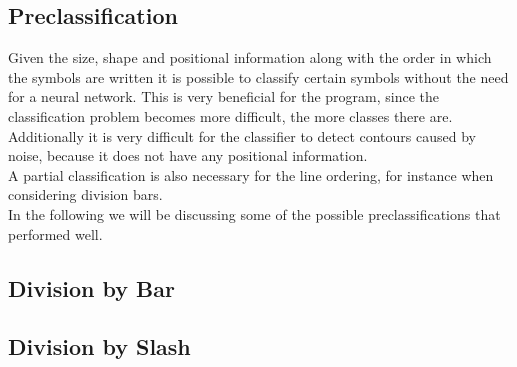 \documentclass[12pt]{article}
\begin{document}
\begin{itemize}
\begin{itemize}
\begin{itemize}
\begin{itemize}
\begin{itemize}
\begin{itemize}
\begin{itemize}
\begin{itemize}
\begin{itemize}
\begin{itemize}
\section{Preclassification}
	Given the size, shape and positional information along with the order in which the symbols are written it is possible to classify certain symbols without the need for a neural network.
	This is very beneficial for the program, since the classification problem becomes more difficult, the more classes there are.
	Additionally it is very difficult for the classifier to detect contours caused by noise, because it does not have any positional information.\\
	A partial classification is also necessary for the line ordering, for instance when considering division bars.\\
	In the following we will be discussing some of the possible preclassifications that performed well.
	
	\subsection{Division by Bar}
	
	\subsection{Division by Slash}
	

\end{itemize}
\end{itemize}
\end{itemize}
\end{itemize}
\end{itemize}
\end{itemize}
\end{itemize}
\end{itemize}
\end{itemize}
\end{itemize}
\end{document}
